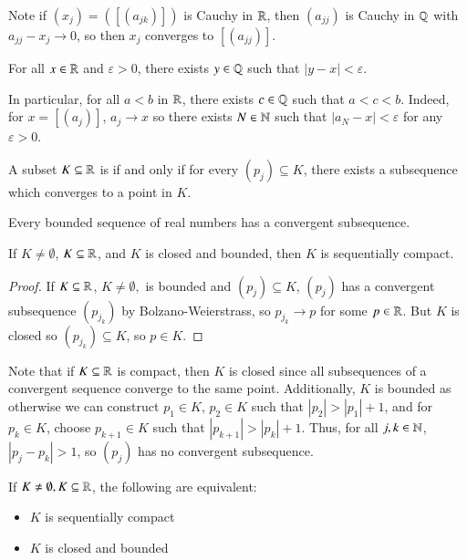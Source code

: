 Note if $(x_j) = ([(a_{jk})])$ is Cauchy in $\mathbb R$, then $(a_{jj})$ is Cauchy in $\mathbb Q$ with $a_{jj} - x_j \rightarrow 0$, so then $x_j$ converges to $[(a_{jj})]$.

\begin{proposition}
    For all $x \in \mathbb R$ and $\varepsilon > 0$, there exists $y \in \mathbb Q$ such that $|y-x| < \varepsilon$.
\end{proposition}
In particular, for all $a < b$ in $\mathbb R$, there exists $c \in \mathbb Q$ such that $a < c < b$. Indeed, for $x = [(a_j)]$, $a_j \rightarrow x$ so there exists $N \in \mathbb N$ such that $|a_N - x| < \varepsilon$ for any $\varepsilon > 0$.

\begin{definition}
    A subset $K \subseteq \mathbb R$ is  if and only if for every  $(p_j) \subseteq K$, there exists a subsequence which converges to a point in $K$.
\end{definition}

\begin{theorem}
    Every bounded sequence of real numbers has a convergent subsequence.
\end{theorem}


\begin{theorem}\label{thm:1.9.2}
    If $K \neq \emptyset$, $K \subseteq \mathbb R$, and $K$ is closed and bounded, then $K$ is sequentially compact.
\end{theorem}
\begin{proof}
    If $K \subseteq \mathbb R$, $K \neq \emptyset,$ is bounded and $(p_j) \subseteq K$, $(p_j)$ has a convergent subsequence $(p_{j_k})$ by Bolzano-Weierstrass, so $p_{j_k}\rightarrow p$ for some $p \in \mathbb R$. But $K$ is closed so $(p_{j_k}) \subseteq K$, so $p \in K$.
\end{proof}

Note that if $K \subseteq \mathbb R$ is compact, then $K$ is closed since all subsequences of a convergent sequence converge to the same point. Additionally, $K$ is bounded as otherwise we can construct $p_1 \in K$, $p_2 \in K$ such that $|p_2| > |p_1| + 1$, and for $p_k \in K$, choose $p_{k+1} \in K$ such that $|p_{k+1}| > |p_k| + 1$. Thus, for all $j,k \in \mathbb N$, $|p_j - p_k| > 1$, so $(p_j)$ has no convergent subsequence.

\begin{theorem}
    If $K \neq \emptyset, K \subseteq \mathbb R$, the following are equivalent: \begin{itemize}
        \item $K$ is sequentially compact
        \item $K$ is closed and bounded
    \end{itemize}
\end{theorem}

